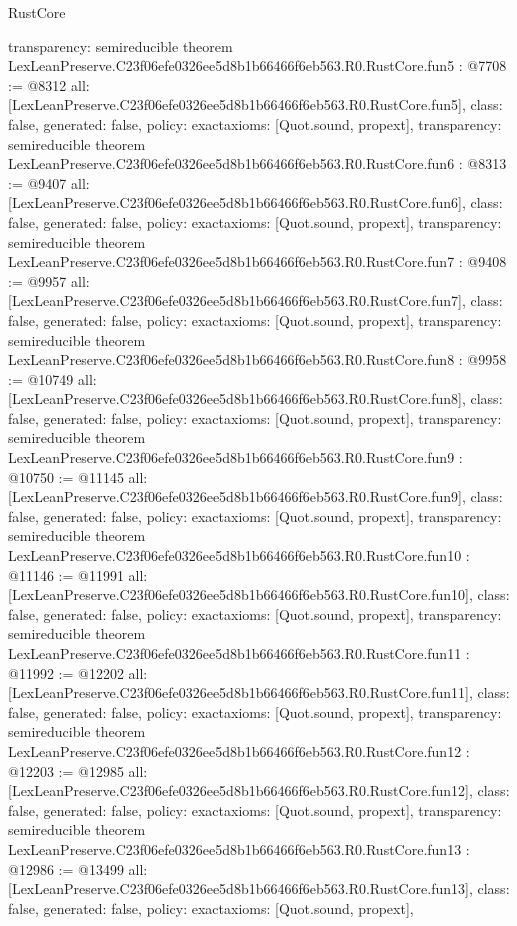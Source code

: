 \begin{lexlean}{RustCore}
\begin{coremodule}
{  transparency: semireducible
}
theorem LexLeanPreserve.C23f06efe0326ee5d8b1b66466f6eb563.R0.RustCore.fun5 : @7708 := @8312 {
  all: [LexLeanPreserve.C23f06efe0326ee5d8b1b66466f6eb563.R0.RustCore.fun5],
  class: false,
  generated: false,
  policy: exact{axioms: [Quot.sound, propext]},
  transparency: semireducible
}
theorem LexLeanPreserve.C23f06efe0326ee5d8b1b66466f6eb563.R0.RustCore.fun6 : @8313 := @9407 {
  all: [LexLeanPreserve.C23f06efe0326ee5d8b1b66466f6eb563.R0.RustCore.fun6],
  class: false,
  generated: false,
  policy: exact{axioms: [Quot.sound, propext]},
  transparency: semireducible
}
theorem LexLeanPreserve.C23f06efe0326ee5d8b1b66466f6eb563.R0.RustCore.fun7 : @9408 := @9957 {
  all: [LexLeanPreserve.C23f06efe0326ee5d8b1b66466f6eb563.R0.RustCore.fun7],
  class: false,
  generated: false,
  policy: exact{axioms: [Quot.sound, propext]},
  transparency: semireducible
}
theorem LexLeanPreserve.C23f06efe0326ee5d8b1b66466f6eb563.R0.RustCore.fun8 : @9958 := @10749 {
  all: [LexLeanPreserve.C23f06efe0326ee5d8b1b66466f6eb563.R0.RustCore.fun8],
  class: false,
  generated: false,
  policy: exact{axioms: [Quot.sound, propext]},
  transparency: semireducible
}
theorem LexLeanPreserve.C23f06efe0326ee5d8b1b66466f6eb563.R0.RustCore.fun9 : @10750 := @11145 {
  all: [LexLeanPreserve.C23f06efe0326ee5d8b1b66466f6eb563.R0.RustCore.fun9],
  class: false,
  generated: false,
  policy: exact{axioms: [Quot.sound, propext]},
  transparency: semireducible
}
theorem LexLeanPreserve.C23f06efe0326ee5d8b1b66466f6eb563.R0.RustCore.fun10 : @11146 := @11991 {
  all: [LexLeanPreserve.C23f06efe0326ee5d8b1b66466f6eb563.R0.RustCore.fun10],
  class: false,
  generated: false,
  policy: exact{axioms: [Quot.sound, propext]},
  transparency: semireducible
}
theorem LexLeanPreserve.C23f06efe0326ee5d8b1b66466f6eb563.R0.RustCore.fun11 : @11992 := @12202 {
  all: [LexLeanPreserve.C23f06efe0326ee5d8b1b66466f6eb563.R0.RustCore.fun11],
  class: false,
  generated: false,
  policy: exact{axioms: [Quot.sound, propext]},
  transparency: semireducible
}
theorem LexLeanPreserve.C23f06efe0326ee5d8b1b66466f6eb563.R0.RustCore.fun12 : @12203 := @12985 {
  all: [LexLeanPreserve.C23f06efe0326ee5d8b1b66466f6eb563.R0.RustCore.fun12],
  class: false,
  generated: false,
  policy: exact{axioms: [Quot.sound, propext]},
  transparency: semireducible
}
theorem LexLeanPreserve.C23f06efe0326ee5d8b1b66466f6eb563.R0.RustCore.fun13 : @12986 := @13499 {
  all: [LexLeanPreserve.C23f06efe0326ee5d8b1b66466f6eb563.R0.RustCore.fun13],
  class: false,
  generated: false,
  policy: exact{axioms: [Quot.sound, propext]},
}
\end{coremodule}
\end{lexlean}
